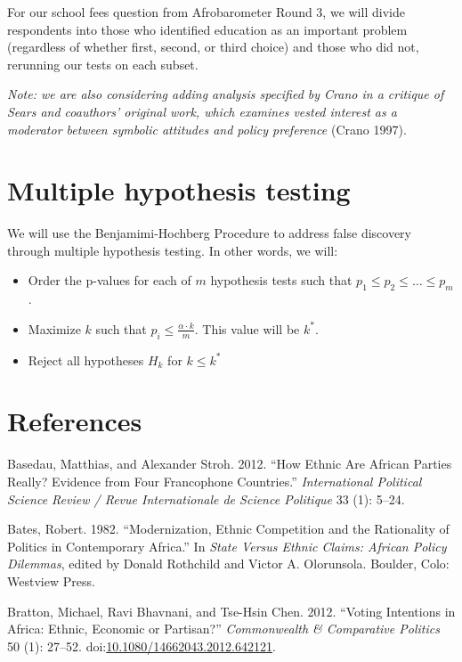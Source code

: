 \documentclass[]{article}
\begin{document}
For our school fees question from Afrobarometer Round 3, we will divide
respondents into those who identified education as an important problem
(regardless of whether first, second, or third choice) and those who did
not, rerunning our tests on each subset.

\textit{Note: we are also considering adding analysis specified by Crano in a critique of Sears and coauthors' original work, which examines vested interest as a moderator between symbolic attitudes and policy preference}
(Crano 1997).

\section{Multiple hypothesis testing}\label{multiple-hypothesis-testing}

We will use the Benjamimi-Hochberg Procedure to address false discovery
through multiple hypothesis testing. In other words, we will:

\begin{itemize}
  \item Order the p-values for each of $m$ hypothesis tests such that $p_1 \leq p_2 \leq \ldots \leq p_m$.
  \item Maximize $k$ such that $p_i \leq \frac{\alpha \cdot k}{m}$. This value will be $k^*$.
  \item Reject all hypotheses $H_k$ for $k \leq k^*$
\end{itemize}

\section*{References}\label{references}

\hypertarget{refs}{}
\hypertarget{ref-basedau_how_2012}{}
Basedau, Matthias, and Alexander Stroh. 2012. ``How Ethnic Are African
Parties Really? Evidence from Four Francophone Countries.''
\emph{International Political Science Review / Revue Internationale de
Science Politique} 33 (1): 5--24.

\hypertarget{ref-rothchild_modernization_1982}{}
Bates, Robert. 1982. ``Modernization, Ethnic Competition and the
Rationality of Politics in Contemporary Africa.'' In \emph{State Versus
Ethnic Claims: African Policy Dilemmas}, edited by Donald Rothchild and
Victor A. Olorunsola. Boulder, Colo: Westview Press.

\hypertarget{ref-bratton_voting_2012}{}
Bratton, Michael, Ravi Bhavnani, and Tse-Hsin Chen. 2012. ``Voting
Intentions in Africa: Ethnic, Economic or Partisan?'' \emph{Commonwealth
\& Comparative Politics} 50 (1): 27--52.
doi:\href{https://doi.org/10.1080/14662043.2012.642121}{10.1080/14662043.2012.642121}.
\end{document}
